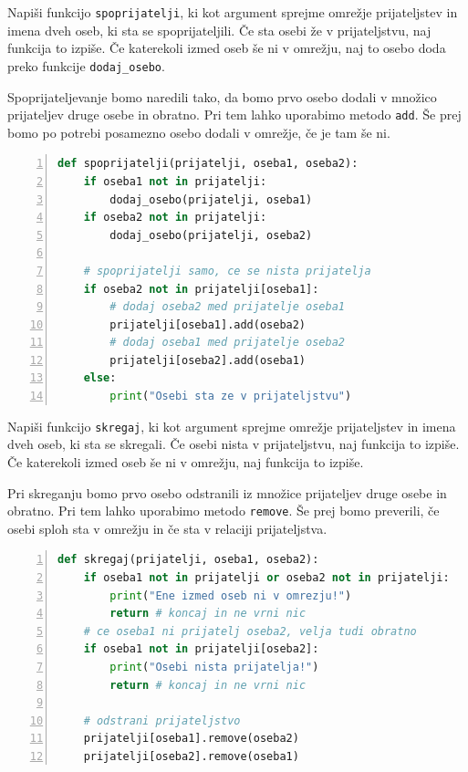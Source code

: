 \begin{zgled}
Napiši funkcijo \texttt{spoprijatelji}, ki kot argument sprejme omrežje prijateljstev in imena dveh oseb, ki sta se spoprijateljili. Če sta osebi že v prijateljstvu, naj funkcija to izpiše. Če katerekoli izmed oseb še ni v omrežju, naj to osebo doda preko funkcije \texttt{dodaj\_osebo}.
\end{zgled}
\begin{resitev}
Spoprijateljevanje bomo naredili tako, da bomo prvo osebo dodali v množico prijateljev druge osebe in obratno. Pri tem lahko uporabimo metodo \texttt{add}. Še prej bomo po potrebi posamezno osebo dodali v omrežje, če je tam še ni.
\begin{lstlisting}[language=Python,numbers=left]
def spoprijatelji(prijatelji, oseba1, oseba2):
    if oseba1 not in prijatelji:
        dodaj_osebo(prijatelji, oseba1) 
    if oseba2 not in prijatelji:
        dodaj_osebo(prijatelji, oseba2) 
    
    # spoprijatelji samo, ce se nista prijatelja
    if oseba2 not in prijatelji[oseba1]:
        # dodaj oseba2 med prijatelje oseba1
        prijatelji[oseba1].add(oseba2)
        # dodaj oseba1 med prijatelje oseba2
        prijatelji[oseba2].add(oseba1)
    else:
        print("Osebi sta ze v prijateljstvu")
\end{lstlisting}
\end{resitev}

\begin{zgled}
Napiši funkcijo \texttt{skregaj}, ki kot argument sprejme omrežje prijateljstev in imena dveh oseb, ki sta se skregali. Če osebi nista v prijateljstvu, naj funkcija to izpiše. Če katerekoli izmed oseb še ni v omrežju, naj funkcija to izpiše. 
\end{zgled}
\begin{resitev}
Pri skreganju bomo prvo osebo odstranili iz množice prijateljev druge osebe in obratno. Pri tem lahko uporabimo metodo \texttt{remove}. Še prej bomo preverili, če osebi sploh sta v omrežju in če sta v relaciji prijateljstva.
\begin{lstlisting}[language=Python,numbers=left]
def skregaj(prijatelji, oseba1, oseba2):
    if oseba1 not in prijatelji or oseba2 not in prijatelji:
        print("Ene izmed oseb ni v omrezju!")
        return # koncaj in ne vrni nic
    # ce oseba1 ni prijatelj oseba2, velja tudi obratno
    if oseba1 not in prijatelji[oseba2]:    
        print("Osebi nista prijatelja!")
        return # koncaj in ne vrni nic
    
    # odstrani prijateljstvo
    prijatelji[oseba1].remove(oseba2)
    prijatelji[oseba2].remove(oseba1)
\end{lstlisting}
\end{resitev}

